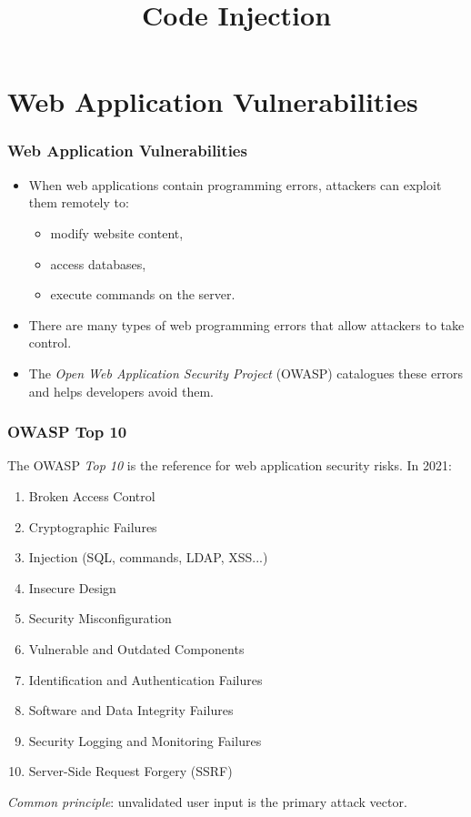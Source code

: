 \documentclass{beamer}
\title{Code Injection}
\def\emptyline{\vspace{10pt}}
\newcommand{\blue}[1]{\textit{\color{blue}#1}}
\begin{document}
\maketitle


\section{Web Application Vulnerabilities}

\begin{frame}
\frametitle{Web Application Vulnerabilities}

\begin{itemize}
\item When web applications contain programming errors, attackers can exploit them remotely to:
\begin{itemize}
\item modify website content,
\item access databases,
\item execute commands on the server.
\end{itemize}
\item There are many types of web programming errors that allow attackers to take control.
\item The \textit{Open Web Application Security Project} (OWASP) catalogues these errors and helps developers avoid them.
\end{itemize}
\end{frame}


\begin{frame}
\frametitle{OWASP Top 10}

The OWASP \textit{Top 10} is the reference for web application security risks. In 2021:
\begin{enumerate}
\item \alert{Broken Access Control}
\item Cryptographic Failures
\item \alert{Injection} (SQL, commands, LDAP, XSS...)
\item Insecure Design
\item Security Misconfiguration
\item Vulnerable and Outdated Components
\item Identification and Authentication Failures
\item Software and Data Integrity Failures
\item Security Logging and Monitoring Failures
\item \alert{Server-Side Request Forgery (SSRF)}
\end{enumerate}
\emptyline
\blue{Common principle}: unvalidated user input is the primary attack vector.
\end{frame}
\end{document}
